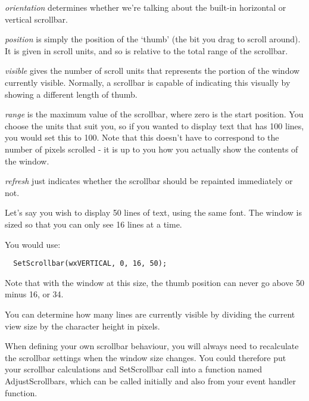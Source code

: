 {\it orientation} determines whether we're talking about
the built-in horizontal or vertical scrollbar.

{\it position} is simply the position of the `thumb' (the bit you drag to scroll around).
It is given in scroll units, and so is relative to the total range of the scrollbar.

{\it visible} gives the number of scroll units that represents the portion of the
window currently visible. Normally, a scrollbar is capable of indicating this visually
by showing a different length of thumb.

{\it range} is the maximum value of the scrollbar, where zero is the start
position. You choose the units that suit you,
so if you wanted to display text that has 100 lines, you would set this to 100.
Note that this doesn't have to correspond to the number of pixels scrolled - it is
up to you how you actually show the contents of the window.

{\it refresh} just indicates whether the scrollbar should be repainted immediately or not.


Let's say you wish to display 50 lines of text, using the same font.
The window is sized so that you can only see 16 lines at a time.

You would use:

{\small%
\begin{verbatim}
  SetScrollbar(wxVERTICAL, 0, 16, 50);
\end{verbatim}
}

Note that with the window at this size, the thumb position can never go
above 50 minus 16, or 34.

You can determine how many lines are currently visible by dividing the current view
size by the character height in pixels.

When defining your own scrollbar behaviour, you will always need to recalculate
the scrollbar settings when the window size changes. You could therefore put your
scrollbar calculations and SetScrollbar
call into a function named AdjustScrollbars, which can be called initially and also
from your  event handler function.




